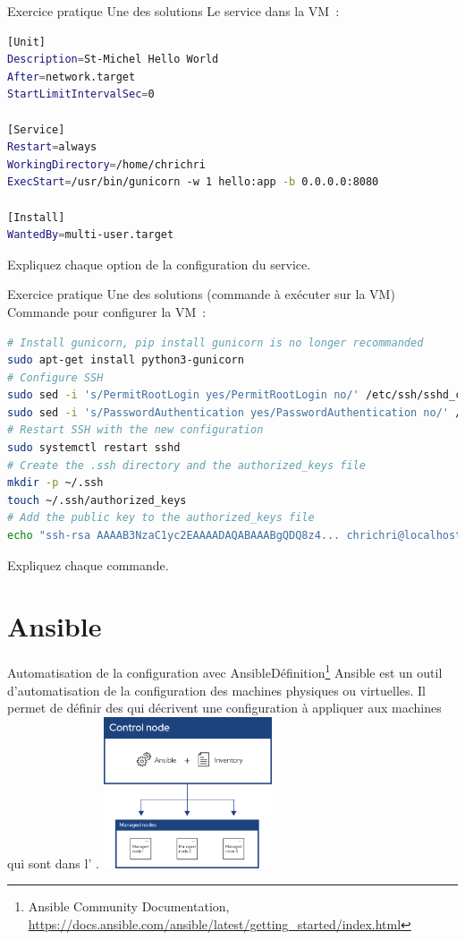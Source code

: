 \documentclass{beamer}
\begin{document}
    \begin{frame}[fragile]{Exercice pratique \execcounterdispinc{}}{Une des solutions}
        Le service dans la VM~:
        \begin{lstlisting}[language=bash]
[Unit]
Description=St-Michel Hello World
After=network.target
StartLimitIntervalSec=0

[Service]
Restart=always
WorkingDirectory=/home/chrichri
ExecStart=/usr/bin/gunicorn -w 1 hello:app -b 0.0.0.0:8080

[Install]
WantedBy=multi-user.target
        \end{lstlisting}
        Expliquez chaque option de la configuration du service.
    \end{frame}

    \begin{frame}[fragile]{Exercice pratique \execcounterdispinc{}}{Une des solutions (commande à exécuter sur la VM)}
        Commande pour configurer la VM~:
        \begin{lstlisting}[language=bash]
# Install gunicorn, pip install gunicorn is no longer recommanded
sudo apt-get install python3-gunicorn
# Configure SSH
sudo sed -i 's/PermitRootLogin yes/PermitRootLogin no/' /etc/ssh/sshd_config
sudo sed -i 's/PasswordAuthentication yes/PasswordAuthentication no/' /etc/ssh/sshd_config
# Restart SSH with the new configuration
sudo systemctl restart sshd
# Create the .ssh directory and the authorized_keys file
mkdir -p ~/.ssh
touch ~/.ssh/authorized_keys
# Add the public key to the authorized_keys file
echo "ssh-rsa AAAAB3NzaC1yc2EAAAADAQABAAABgQDQ8z4... chrichri@localhost" >> ~/.ssh/authorized_keys
        \end{lstlisting}
        Expliquez chaque commande.
    \end{frame}


    \section{Ansible}\label{sec:ansible}

    \begin{frame}{Automatisation de la configuration avec Ansible}{Définition\footnote{Ansible Community Documentation, \url{https://docs.ansible.com/ansible/latest/getting_started/index.html}}}
        Ansible est un outil d'automatisation de la configuration des machines physiques ou virtuelles.
        Il permet de définir des  qui décrivent une configuration à appliquer aux machines qui sont dans l' .
        \bigbreak
        \centering
        \includegraphics[width=5cm]{image/ansible}
    \end{frame}
\end{document}

